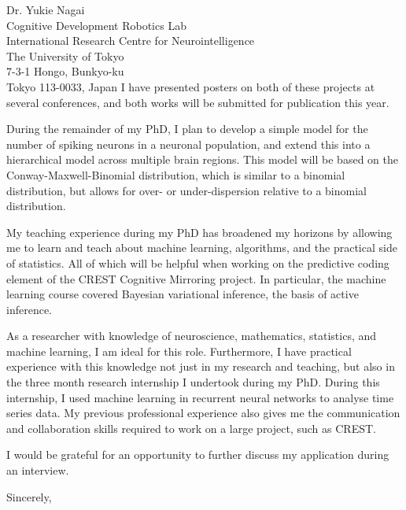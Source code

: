 \documentclass[11pt]{letter} %
\begin{document}
\begin{letter}{Dr. Yukie Nagai \\ 
  Cognitive Development Robotics Lab \\ 
  International Research Centre for Neurointelligence \\
  The University of Tokyo \\
  7-3-1 Hongo, Bunkyo-ku \\
  Tokyo 113-0033, Japan}
  I have presented posters on both of these projects at several conferences, and both works will be submitted for publication this year. 

  During the remainder of my PhD, I plan to develop a simple model for the number of spiking neurons in a neuronal population, and extend this into a hierarchical model across multiple brain regions. This model will be based on the Conway-Maxwell-Binomial distribution, which is similar to a binomial distribution, but allows for over- or under-dispersion relative to a binomial distribution. 

  My teaching experience during my PhD has broadened my horizons by allowing me to learn and teach about machine learning, algorithms, and the practical side of statistics. All of which will be helpful when working on the predictive coding element of the CREST Cognitive Mirroring project. In particular, the machine learning course covered Bayesian variational inference, the basis of active inference.

  As a researcher with knowledge of neuroscience, mathematics, statistics, and machine learning, I am ideal for this role. Furthermore, I have practical experience with this knowledge not just in my research and teaching, but also in the three month research internship I undertook during my PhD. During this internship, I used machine learning in recurrent neural networks to analyse time series data. My previous professional experience also gives me the communication and collaboration skills required to work on a large project, such as CREST. 

  I would be grateful for an opportunity to further discuss my application during an interview.

  \vspace{2\parskip} %
  \closing{Sincerely,}
  \vspace{2\parskip} %




\end{letter}
 
\end{document}
